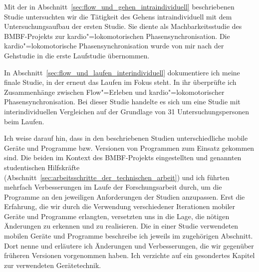 Mit der in Abschnitt~\ref{sec:flow_und_gehen_intraindividuell} beschriebenen Studie untersuchten wir die Tätigkeit des Gehens intraindividuell mit dem Untersuchungsaufbau der ersten Studie. Sie diente als Machbarkeitsstudie des \acs{BMBF}-Projekts zur kardio"=lokomotorischen Phasensynchronisation. Die kardio"=lokomotorische Phasensynchronisation wurde von mir nach der Gehstudie in die erste Laufstudie übernommen. 

In Abschnitt~\ref{sec:flow_und_laufen_interindividuell} dokumentiere ich meine finale Studie, in der erneut das Laufen im Fokus steht. In ihr überprüfte ich Zusammenhänge zwischen Flow"=Erleben und kardio"=lokomotorischer Phasensynchronisation. Bei dieser Studie handelte es sich um eine Studie mit interindividuellen Vergleichen auf der Grundlage von 31 Untersuchungspersonen beim Laufen. 

Ich weise darauf hin, dass in den beschriebenen Studien unterschiedliche mobile Geräte und Programme bzw. Versionen von Programmen zum Einsatz gekommen sind. Die beiden im Kontext des \acs{BMBF}-Projekts eingestellten und genannten studentischen Hilfskräfte (Abschnitt~\ref{sec:arbeitsschritte_der_technischen_arbeit}) und ich führten mehrfach Verbesserungen im Laufe der Forschungsarbeit durch, um die Programme an den jeweiligen Anforderungen der Studien anzupassen. Erst die Erfahrung, die wir durch die Verwendung verschiedener Iterationen mobiler Geräte und Programme erlangten, versetzten uns in die Lage, die nötigen Änderungen zu erkennen und zu realisieren. Die in einer Studie verwendeten mobilen Geräte und Programme beschreibe ich jeweils im zugehörigen Abschnitt. Dort nenne und erläutere ich Änderungen und Verbesserungen, die wir gegenüber früheren Versionen vorgenommen haben. Ich verzichte auf ein gesondertes Kapitel zur verwendeten Gerätetechnik.
